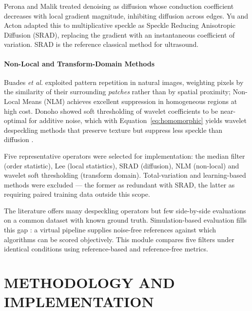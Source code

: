 \documentclass[12pt,a4paper,oneside]{report}
\begin{document}
Perona and Malik \cite{perona1990anisotropic} treated denoising as diffusion whose
conduction coefficient decreases with local gradient magnitude, inhibiting
diffusion across edges. Yu and Acton \cite{yu2002srad} adapted this to
multiplicative speckle as Speckle Reducing Anisotropic Diffusion (SRAD), replacing
the gradient with an instantaneous coefficient of variation. SRAD is the reference
classical method for ultrasound.

\subsubsection{Non-Local and Transform-Domain Methods}

Buades \emph{et al.} \cite{buades2005nlm} exploited pattern repetition in natural
images, weighting pixels by the similarity of their surrounding \emph{patches}
rather than by spatial proximity; Non-Local Means (NLM) achieves excellent
suppression in homogeneous regions at high cost. Donoho \cite{donoho1995wavelet}
showed soft thresholding of wavelet coefficients to be near-optimal for additive
noise, which with Equation~\eqref{eq:homomorphic} yields wavelet despeckling
methods that preserve texture but suppress less speckle than diffusion
\cite{aja2015survey}.

Five representative operators were selected for implementation: the median filter
(order statistic), Lee (local statistics), SRAD (diffusion), NLM (non-local) and
wavelet soft thresholding (transform domain). Total-variation and learning-based
methods were excluded --- the former as redundant with SRAD, the latter as
requiring paired training data outside this scope.

The literature offers many despeckling operators but few side-by-side evaluations
on a common dataset with known ground truth. Simulation-based evaluation fills this
gap \cite{abadi2020vct}: a virtual pipeline supplies noise-free references against
which algorithms can be scored objectively. This module compares five filters under
identical conditions using reference-based and reference-free metrics.

\chapter{METHODOLOGY AND IMPLEMENTATION}
\label{ch:methodology}
\end{document}
